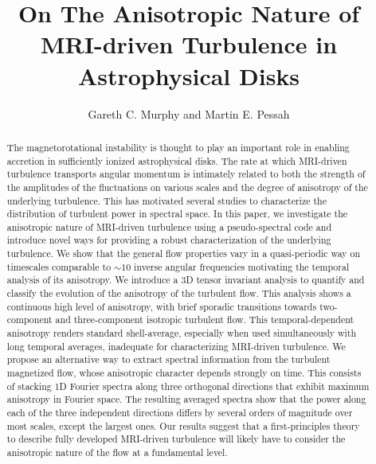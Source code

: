 \documentclass[]{emulateapj}
\begin{document}
\title{On The Anisotropic Nature of MRI-driven Turbulence in Astrophysical Disks}
	


\author{Gareth C. Murphy and Martin E. Pessah}


\begin{abstract}
The magnetorotational instability is thought to play an important role
in enabling accretion in sufficiently ionized astrophysical disks.
The rate at which MRI-driven turbulence transports angular momentum 
is intimately related to both the strength of the amplitudes
of the fluctuations on various scales and the degree of anisotropy of
the underlying turbulence.  This has motivated several studies to
characterize the distribution of turbulent power in spectral space.  In this
paper, we investigate the anisotropic nature of MRI-driven turbulence
using a pseudo-spectral code and introduce novel ways for providing a
robust characterization of the underlying turbulence.  We show that the
general flow properties vary in a quasi-periodic way on timescales
comparable to $\sim\!\!10$ inverse angular frequencies motivating the
temporal analysis of its anisotropy.  We introduce a 3D tensor
invariant analysis to quantify and classify the evolution of the
anisotropy of the turbulent flow. This analysis shows a
continuous high level of anisotropy, with brief sporadic transitions
towards two-component and three-component isotropic turbulent flow.
This temporal-dependent anisotropy renders standard shell-average,
especially when used simultaneously with long temporal averages,
inadequate for characterizing MRI-driven turbulence.  We propose an
alternative way to extract spectral information from the turbulent
magnetized flow, whose anisotropic character depends strongly on time.
This consists of stacking 1D Fourier spectra along three orthogonal
directions that exhibit maximum anisotropy in Fourier space.  The
resulting averaged spectra show that the power along each of the three
independent directions differs by several orders of magnitude over
most scales, except the largest ones.  Our results suggest that a
first-principles theory to describe fully developed  MRI-driven 
turbulence will likely have to consider the anisotropic nature of the flow 
at a fundamental level.
\end{abstract}


\end{document}
